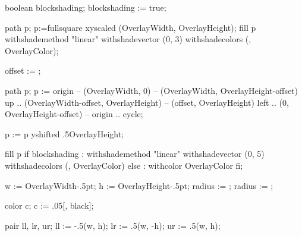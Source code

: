 


\startmodule [slide-mp]

\unprotect


	boolean blockshading; blockshading := true;
\stopMPdefinitions

	path p; p:=fullsquare xyscaled (OverlayWidth, OverlayHeight);
	fill p
		withshademethod "linear"
		withshadevector (0, 3)
		withshadecolors (, OverlayColor);
\stopuseMPgraphic

	offset := ;

	path p; p :=
		origin                                    -- (OverlayWidth, 0)                    --
		(OverlayWidth, OverlayHeight-offset) {up} .. (OverlayWidth-offset, OverlayHeight) --
		(offset, OverlayHeight) {left}            .. (0, OverlayHeight-offset)            --
		origin                                    .. cycle;

	p := p yshifted .5OverlayHeight;

	fill p
		if blockshading :
			withshademethod "linear"
			withshadevector (0, 5)
			withshadecolors (, OverlayColor)
		else :
			withcolor OverlayColor
		fi;
\stopuseMPgraphic

	w      := OverlayWidth-.5pt;
	h      := OverlayHeight-.5pt;
	radius := ;
	radius := ;

	color c;
	c := .05[, black];

	pair ll, lr, ur;
	ll := -.5(w,  h);
	lr :=  .5(w, -h);
	ur :=  .5(w,  h);

